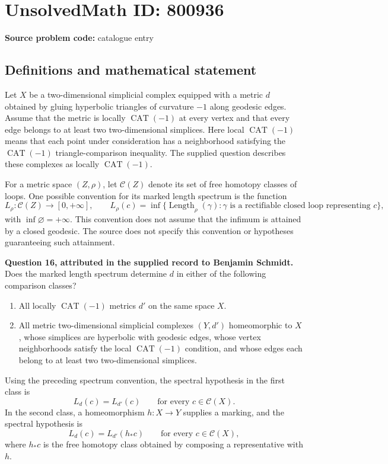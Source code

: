 \documentclass[11pt]{article}
\begin{document}
\section*{UnsolvedMath ID: 800936}
\textbf{Source problem code:} catalogue entry
\subsection{Definitions and mathematical statement}
Let \(X\) be a two-dimensional simplicial complex equipped with a metric \(d\) obtained by gluing hyperbolic triangles of curvature \(-1\) along geodesic edges. Assume that the metric is locally \(\operatorname{CAT}(-1)\) at every vertex and that every edge belongs to at least two two-dimensional simplices. Here local \(\operatorname{CAT}(-1)\) means that each point under consideration has a neighborhood satisfying the \(\operatorname{CAT}(-1)\) triangle-comparison inequality. The supplied question describes these complexes as locally \(\operatorname{CAT}(-1)\).

For a metric space \((Z,\rho)\), let \(\mathcal{C}(Z)\) denote its set of free homotopy classes of loops. One possible convention for its marked length spectrum is the function
\[
L_{\rho}\colon\mathcal{C}(Z)\longrightarrow[0,+\infty],\qquad
L_{\rho}(c)=\inf\{\operatorname{Length}_{\rho}(\gamma):\gamma\text{ is a rectifiable closed loop representing }c\},
\]
with \(\inf\varnothing=+\infty\). This convention does not assume that the infimum is attained by a closed geodesic. The source does not specify this convention or hypotheses guaranteeing such attainment.

\textbf{Question 16, attributed in the supplied record to Benjamin Schmidt.} Does the marked length spectrum determine \(d\) in either of the following comparison classes?
\begin{enumerate}
\item All locally \(\operatorname{CAT}(-1)\) metrics \(d'\) on the same space \(X\).
\item All metric two-dimensional simplicial complexes \((Y,d')\) homeomorphic to \(X\), whose simplices are hyperbolic with geodesic edges, whose vertex neighborhoods satisfy the local \(\operatorname{CAT}(-1)\) condition, and whose edges each belong to at least two two-dimensional simplices.
\end{enumerate}
Using the preceding spectrum convention, the spectral hypothesis in the first class is
\[
L_d(c)=L_{d'}(c)\qquad\text{for every }c\in\mathcal{C}(X).
\]
In the second class, a homeomorphism \(h\colon X\to Y\) supplies a marking, and the spectral hypothesis is
\[
L_d(c)=L_{d'}(h_*c)\qquad\text{for every }c\in\mathcal{C}(X),
\]
where \(h_*c\) is the free homotopy class obtained by composing a representative with \(h\).
\end{document}
